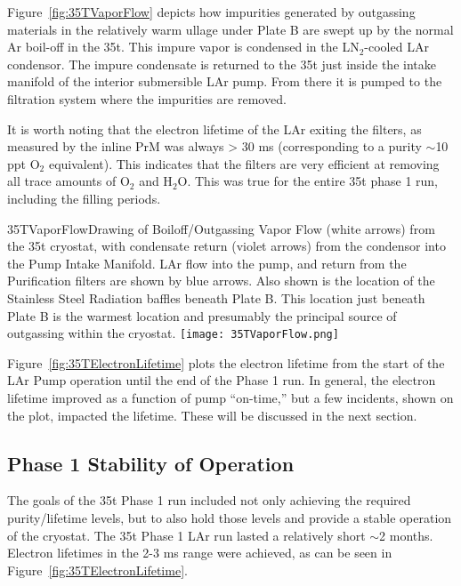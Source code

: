 Figure~\ref{fig:35TVaporFlow} depicts how impurities generated by outgassing materials in the 
relatively warm ullage under Plate B are swept up by the normal Ar boil-off in the 35t. This impure vapor 
is condensed in the LN$_2$-cooled LAr condensor. The impure condensate is returned to the 35t just inside 
the intake manifold of the interior submersible LAr pump. From there it is pumped to the filtration 
system where the impurities are removed.

It is worth noting that the electron lifetime of  the LAr exiting the filters, as measured by the inline PrM was always  
> 30 ms (corresponding to a purity $\sim$10 ppt O$_2$ equivalent). This indicates that the filters are very efficient at removing all 
trace amounts of O$_2$ and H$_2$O. This was true for the entire 35t phase 1 run, including the filling periods.

\begin{cdrfigure}{35TVaporFlow}{Drawing of Boiloff/Outgassing Vapor Flow (white 
arrows) from the 35t cryostat, with condensate return (violet arrows) from the condensor into the Pump 
Intake Manifold. LAr flow into the pump, and return from the Purification filters are shown by blue 
arrows. Also shown is the location of the Stainless Steel Radiation baffles beneath Plate B. This location 
just beneath Plate B is the warmest location and presumably the principal source of outgassing within the 
cryostat.}
  \texttt{[image: 35TVaporFlow.png]}
\end{cdrfigure}

Figure~\ref{fig:35TElectronLifetime} plots the electron lifetime from the start of the LAr Pump operation until the end of the Phase 1 run. In general, the electron lifetime improved as a function of pump 
``on-time,'' but %
a few incidents, shown on the plot, %
impacted the lifetime. These will be discussed in the next section.

\subsection {Phase 1 Stability of Operation}

The goals of the 35t Phase 1 run included not only achieving the required purity/lifetime levels, but to 
also hold those levels and provide  a stable operation of the cryostat. The 35t Phase 1 LAr run lasted a relatively 
short $\sim$2 months.%
Electron lifetimes in the 2-3 ms range were achieved, as can be seen in 
Figure~\ref{fig:35TElectronLifetime}.

